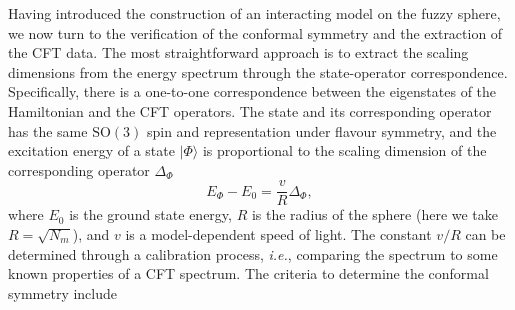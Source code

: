 \documentclass{timesjhep}
\begin{document}
Having introduced the construction of an interacting model on the fuzzy sphere, we now turn to the verification of the conformal symmetry and the extraction of the CFT data. The most straightforward approach is to extract the scaling dimensions from the energy spectrum through the state-operator correspondence. Specifically, there is a one-to-one correspondence between the eigenstates of the Hamiltonian and the CFT operators. The state and its corresponding operator has the same $\mathrm{SO}(3)$ spin and representation under flavour symmetry, and the excitation energy of a state $|\Phi\rangle$ is proportional to the scaling dimension of the corresponding operator $\Delta_\Phi$
\begin{equation}
    E_\Phi-E_0=\frac{v}{R}\Delta_\Phi,
\end{equation}
where $E_0$ is the ground state energy, $R$ is the radius of the sphere (here we take $R=\sqrt{N_m}$), and $v$ is a model-dependent speed of light. The constant $v/R$ can be determined through a calibration process, \textit{i.e.}, comparing the spectrum to some known properties of a CFT spectrum. The criteria to determine the conformal symmetry include
\end{document}
